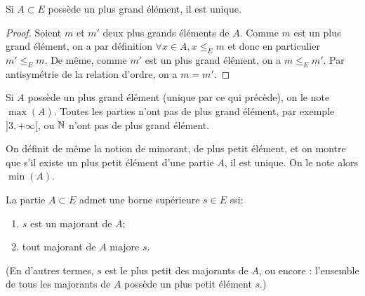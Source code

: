 \begin{proposition}
Si $A\subset E$ possède un plus grand élément, il est unique.
\end{proposition}
\begin{proof}
Soient $m$ et $m'$ deux plus grands éléments de $A$. Comme $m$ est un plus grand élément, on a par définition $\forall x\in A, x\leq_E m$ et donc en particulier $m'\leq_E m$. De même, comme $m'$ est un plus grand élément, on a $m\leq_E m'$. Par antisymétrie de la relation d'ordre, on a $m=m'$.
\end{proof}

Si $A$ possède un plus grand élément (unique par ce qui précède), on le note $\max(A)$. Toutes les parties n'ont pas de plus grand élément, par exemple $]3,+\infty[$, ou $\mathbb{N}$ n'ont pas de plus grand élément.


On définit de même  la notion de minorant, de plus petit élément, et on montre que s'il existe un plus petit élément d'une partie $A$, il est unique. On le note alors $\min(A)$.

\begin{definition} La partie $A\subset E$ admet une borne supérieure $s\in E$ ssi:
\begin{enumerate}
\item $s$ est un majorant de $A$;
\item tout majorant de $A$ majore $s$.
\end{enumerate}
(En d'autres termes, $s$ est le plus petit des majorants de $A$, ou encore : l'ensemble de tous les majorants de $A$ possède un plus petit élément $s$.)
\end{definition}

